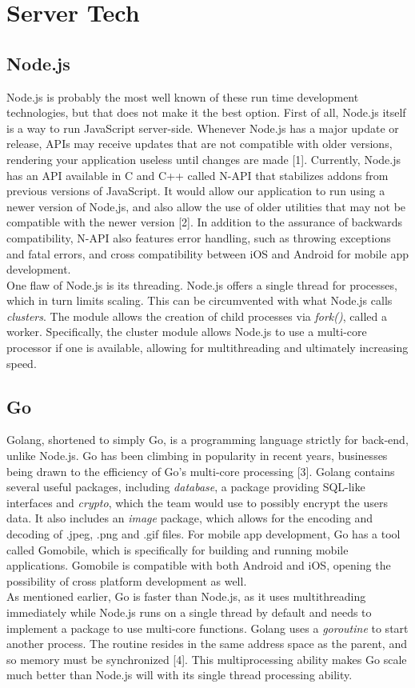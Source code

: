 \documentclass[draftclsnofoot, onecolumn, letterpaper,10pt,compsoc]{IEEEtran}
\begin{document}
\section{Server Tech}
\subsection{Node.js}
Node.js is probably the most well known of these run time development technologies, but that does not  make it the best option.  First of all, Node.js itself is a way to run JavaScript server-side.  Whenever Node.js has a major update or release, APIs may receive updates that are not compatible with older versions, rendering your application useless until changes are made [1].  Currently, Node.js has an API available in C and C++ called N-API that stabilizes addons from previous versions of JavaScript.  It would allow our application to run using a newer version of Node,js, and also allow the use of older utilities that may not be compatible with the newer version [2].  In addition to the assurance of backwards compatibility, N-API also features error handling, such as throwing exceptions and fatal errors, and cross compatibility between iOS and Android for mobile app development.\\
One flaw of Node.js is its threading.  Node.js offers a single thread for processes, which in turn limits scaling.  This can be circumvented with what Node.js calls \textit{clusters}.  The module allows the creation of child processes via \textit{fork()}, called a worker.  Specifically, the cluster module allows Node.js to use a multi-core processor if one is available, allowing for multithreading and ultimately increasing speed.
\subsection{Go}
Golang, shortened to simply Go, is a programming language strictly for back-end, unlike Node.js.  Go has been climbing in popularity in recent years, businesses being drawn to the efficiency of Go's multi-core processing [3].  Golang contains several useful packages, including \textit{database}, a package providing SQL-like interfaces and \textit{crypto}, which the team would use to possibly encrypt the users data.  It also includes an \textit{image} package, which allows for the encoding and decoding of .jpeg, .png and .gif files.  For mobile app development, Go has a tool called Gomobile, which is specifically for building and running mobile applications.  Gomobile is compatible with both Android and iOS, opening the possibility of cross platform development as well.\\
As mentioned earlier, Go is faster than Node.js, as it uses multithreading immediately while Node.js runs on a single thread by default and needs to implement a package to use multi-core functions.  Golang uses a \textit{goroutine} to start another process.  The routine resides in the same address space as the parent, and so memory must be synchronized [4].  This multiprocessing ability makes Go scale much better than Node.js will with its single thread processing ability.
\end{document}

